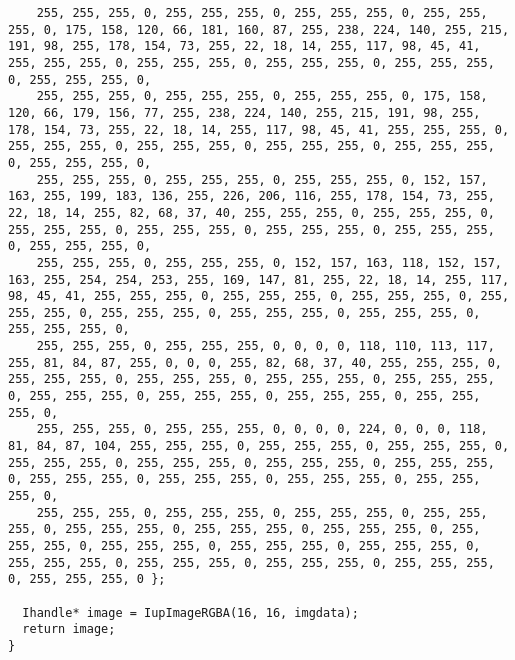 \documentclass{ctexart}
\begin{document}
\begin{lstlisting}
    255, 255, 255, 0, 255, 255, 255, 0, 255, 255, 255, 0, 255, 255, 255, 0, 175, 158, 120, 66, 181, 160, 87, 255, 238, 224, 140, 255, 215, 191, 98, 255, 178, 154, 73, 255, 22, 18, 14, 255, 117, 98, 45, 41, 255, 255, 255, 0, 255, 255, 255, 0, 255, 255, 255, 0, 255, 255, 255, 0, 255, 255, 255, 0,
    255, 255, 255, 0, 255, 255, 255, 0, 255, 255, 255, 0, 175, 158, 120, 66, 179, 156, 77, 255, 238, 224, 140, 255, 215, 191, 98, 255, 178, 154, 73, 255, 22, 18, 14, 255, 117, 98, 45, 41, 255, 255, 255, 0, 255, 255, 255, 0, 255, 255, 255, 0, 255, 255, 255, 0, 255, 255, 255, 0, 255, 255, 255, 0,
    255, 255, 255, 0, 255, 255, 255, 0, 255, 255, 255, 0, 152, 157, 163, 255, 199, 183, 136, 255, 226, 206, 116, 255, 178, 154, 73, 255, 22, 18, 14, 255, 82, 68, 37, 40, 255, 255, 255, 0, 255, 255, 255, 0, 255, 255, 255, 0, 255, 255, 255, 0, 255, 255, 255, 0, 255, 255, 255, 0, 255, 255, 255, 0,
    255, 255, 255, 0, 255, 255, 255, 0, 152, 157, 163, 118, 152, 157, 163, 255, 254, 254, 253, 255, 169, 147, 81, 255, 22, 18, 14, 255, 117, 98, 45, 41, 255, 255, 255, 0, 255, 255, 255, 0, 255, 255, 255, 0, 255, 255, 255, 0, 255, 255, 255, 0, 255, 255, 255, 0, 255, 255, 255, 0, 255, 255, 255, 0,
    255, 255, 255, 0, 255, 255, 255, 0, 0, 0, 0, 118, 110, 113, 117, 255, 81, 84, 87, 255, 0, 0, 0, 255, 82, 68, 37, 40, 255, 255, 255, 0, 255, 255, 255, 0, 255, 255, 255, 0, 255, 255, 255, 0, 255, 255, 255, 0, 255, 255, 255, 0, 255, 255, 255, 0, 255, 255, 255, 0, 255, 255, 255, 0,
    255, 255, 255, 0, 255, 255, 255, 0, 0, 0, 0, 224, 0, 0, 0, 118, 81, 84, 87, 104, 255, 255, 255, 0, 255, 255, 255, 0, 255, 255, 255, 0, 255, 255, 255, 0, 255, 255, 255, 0, 255, 255, 255, 0, 255, 255, 255, 0, 255, 255, 255, 0, 255, 255, 255, 0, 255, 255, 255, 0, 255, 255, 255, 0,
    255, 255, 255, 0, 255, 255, 255, 0, 255, 255, 255, 0, 255, 255, 255, 0, 255, 255, 255, 0, 255, 255, 255, 0, 255, 255, 255, 0, 255, 255, 255, 0, 255, 255, 255, 0, 255, 255, 255, 0, 255, 255, 255, 0, 255, 255, 255, 0, 255, 255, 255, 0, 255, 255, 255, 0, 255, 255, 255, 0, 255, 255, 255, 0 };

  Ihandle* image = IupImageRGBA(16, 16, imgdata);
  return image;
}


\end{lstlisting}
\end{document}
